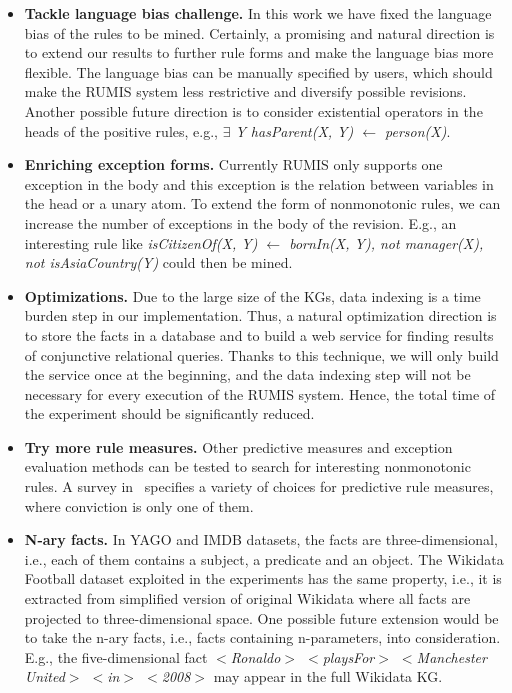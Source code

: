 \begin{itemize}
\item \textbf{Tackle language bias challenge.} In this work we have fixed the language bias of the rules to be mined. Certainly, a promising and natural direction is to extend our results to further rule forms and make the language bias more flexible. The language bias can be manually specified by users, which should make the RUMIS system less restrictive and diversify possible revisions. Another possible future direction is to consider existential operators in the heads of the positive rules, e.g., \textit{$\exists$ Y hasParent(X, Y) $\leftarrow$ person(X)}.
\item \textbf{Enriching exception forms.} Currently RUMIS only supports one exception in the body and this exception is the relation between variables in the head or a unary atom. To extend the form of nonmonotonic rules, we can increase the number of exceptions in the body of the revision. E.g., an interesting rule like \textit{isCitizenOf(X, Y) $\leftarrow$ bornIn(X, Y), not manager(X), not isAsiaCountry(Y)} could then be mined.
\item \textbf{Optimizations.} Due to the large size of the KGs, data indexing is a time burden step in our implementation. Thus, a natural optimization direction is to store the facts in a database and to build a web service for finding results of conjunctive relational queries. Thanks to this technique, we will only build the service once at the beginning, and the data indexing step will not be necessary for every execution of the RUMIS system. Hence, the total time of the experiment should be significantly reduced.
\item \textbf{Try more rule measures.} Other predictive measures and exception evaluation methods can be tested to search for interesting nonmonotonic rules. A survey in~\cite{ref46} specifies a variety of choices for predictive rule measures, where conviction is only one of them.
\item \textbf{N-ary facts.} In YAGO and IMDB datasets, the facts are three-dimensional, i.e., each of them contains a subject, a predicate and an object. The Wikidata Football dataset exploited in the experiments has the same property, i.e., it is extracted from simplified version of original Wikidata where all facts are projected to three-dimensional space. One possible future extension would be to take the n-ary facts, i.e., facts containing n-parameters, into consideration. E.g., the five-dimensional fact \textit{$<$Ronaldo$>$ $<$playsFor$>$ $<$Manchester United$>$ $<$in$>$ $<$2008$>$} may appear in the full Wikidata KG.

\end{itemize}
